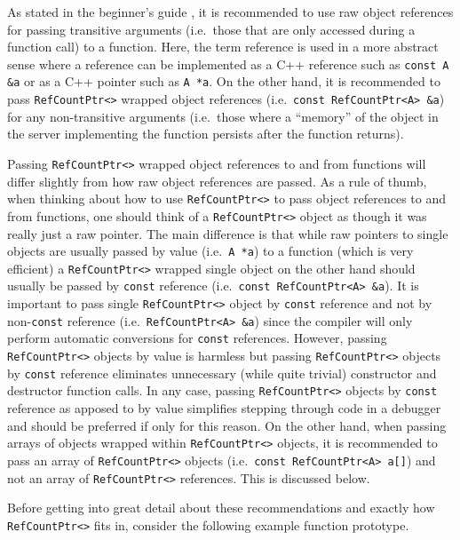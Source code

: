 As stated in the beginner's guide
{}\cite{ref:RefCountPtrBeginnersGuide}, it is recommended to use raw
object references for passing transitive arguments (i.e.~those that
are only accessed during a function call) to a function.  Here, the
term reference is used in a more abstract sense where a reference can
be implemented as a C++ reference such as {}\texttt{const A \&a} or as
a C++ pointer such as {}\texttt{A *a}.  On the other hand, it is
recommended to pass {}\texttt{Ref\-Count\-Ptr<>} wrapped object
references (i.e.~{}\texttt{const Ref\-Count\-Ptr<A> \&a}) for any
non-transitive arguments (i.e.~those where a ``memory'' of the object
in the server implementing the function persists after the function
returns).

Passing {}\texttt{Ref\-Count\-Ptr<>} wrapped object references to and
from functions will differ slightly from how raw object references are
passed.  As a rule of thumb, when thinking about how to use
{}\texttt{Ref\-Count\-Ptr<>} to pass object references to and from
functions, one should think of a {}\texttt{Ref\-Count\-Ptr<>} object
as though it was really just a raw pointer.  The main difference is
that while raw pointers to single objects are usually passed by value
(i.e.~{}\texttt{A *a}) to a function (which is very efficient) a
{}\texttt{Ref\-Count\-Ptr<>} wrapped single object on the other hand
should usually be passed by {}\texttt{const} reference
(i.e.~{}\texttt{const Ref\-Count\-Ptr<A> \&a}).  It is important to
pass single {}\texttt{Ref\-Count\-Ptr<>} object by {}\texttt{const}
reference and not by non-{}\texttt{const} reference
(i.e.~{}\texttt{Ref\-Count\-Ptr<A> \&a}) since the compiler will only
perform automatic conversions for {}\texttt{const} references.
However, passing {}\texttt{Ref\-Count\-Ptr<>} objects by value is
harmless but passing {}\texttt{Ref\-Count\-Ptr<>} objects by
{}\texttt{const} reference eliminates unnecessary (while quite
trivial) constructor and destructor function calls.  In any case,
passing {}\texttt{Ref\-Count\-Ptr<>} objects by {}\texttt{const}
reference as apposed to by value simplifies stepping through code in a
debugger and should be preferred if only for this reason.  On the
other hand, when passing arrays of objects wrapped within
{}\texttt{Ref\-Count\-Ptr<>} objects, it is recommended to pass an
array of {}\texttt{Ref\-Count\-Ptr<>} objects (i.e.~{}\texttt{const
Ref\-Count\-Ptr<A> a[]}) and not an array of
{}\texttt{Ref\-Count\-Ptr<>} references.  This is discussed below.

Before getting into great detail about these recommendations and
exactly how {}\texttt{Ref\-Count\-Ptr<>} fits in, consider the
following example function prototype.


